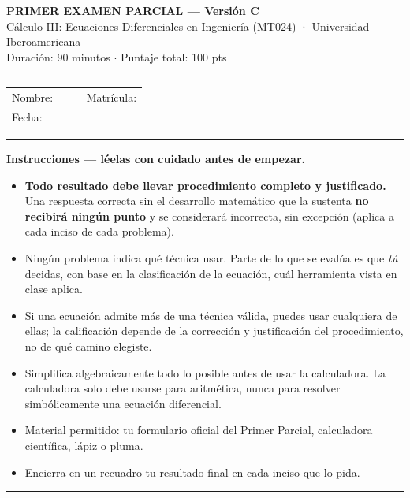 \documentclass[11pt,letterpaper]{article}
\newenvironment{aviso}{%
  \par\vspace{2pt}\hrule\vspace{6pt}
}{%
  \par\vspace{6pt}\hrule\vspace{2pt}
}
\begin{document}
\begin{center}
{\Large\bfseries PRIMER EXAMEN PARCIAL --- Versión C}\\[2pt]
{\small Cálculo III: Ecuaciones Diferenciales en Ingeniería (MT024) · Universidad Iberoamericana}\\[1pt]
{\small Duración: 90 minutos \; $\cdot$ \; Puntaje total: 100 pts}
\end{center}

\vspace{4pt}\hrule\vspace{10pt}

\noindent
\begin{tabular}{@{}p{0.55\linewidth}p{0.45\linewidth}@{}}
Nombre: \dotfill & Matrícula: \dotfill \\[10pt]
Fecha: \dotfill & \\[10pt]
\end{tabular}

\vspace{6pt}

\begin{aviso}
\textbf{Instrucciones — léelas con cuidado antes de empezar.}
\begin{itemize}[leftmargin=1.4em, itemsep=2pt, topsep=4pt]
  \item \textbf{Todo resultado debe llevar procedimiento completo y justificado.} Una respuesta correcta sin el desarrollo matemático que la sustenta \textbf{no recibirá ningún punto} y se considerará incorrecta, sin excepción (aplica a cada inciso de cada problema).
  \item Ningún problema indica qué técnica usar. Parte de lo que se evalúa es que \emph{tú} decidas, con base en la clasificación de la ecuación, cuál herramienta vista en clase aplica.
  \item Si una ecuación admite más de una técnica válida, puedes usar cualquiera de ellas; la calificación depende de la corrección y justificación del procedimiento, no de qué camino elegiste.
  \item Simplifica algebraicamente todo lo posible antes de usar la calculadora. La calculadora solo debe usarse para aritmética, nunca para resolver simbólicamente una ecuación diferencial.
  \item Material permitido: tu formulario oficial del Primer Parcial, calculadora científica, lápiz o pluma.
  \item Encierra en un recuadro tu resultado final en cada inciso que lo pida.
\end{itemize}
\end{aviso}
\end{document}

